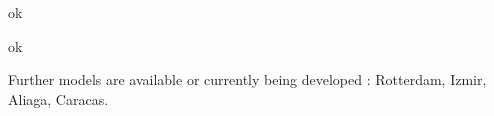  ok \clearpage

 \clearpage

 \clearpage

 \clearpage

 \clearpage

 \clearpage

 ok

 \clearpage

 \clearpage

 \clearpage

 \clearpage

Further models are available or currently being developed \citep[][]{Axhausen_unpub_Hong_Kong_2013, MATSIM-T-Scenarios_Webpage_2014}: Rotterdam, Izmir, Aliaga, Caracas.


